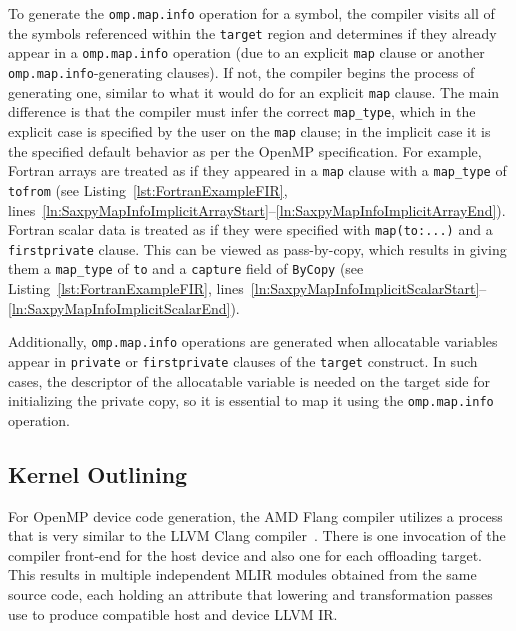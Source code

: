 \documentclass[acmtog,natbib=false]{acmart}
\newcommand{\code}[1]{\texttt{#1}\xspace}
\begin{document}
To generate the \code{omp.map.info} operation for a symbol, the compiler visits all of the symbols referenced within the \code{target} region and determines if they already appear in a \code{omp.map.info} operation (due to an explicit \code{map} clause or another \code{omp.map.info}-generating clauses). 
If not, the compiler begins the process of generating one, similar to what it would do for an explicit \code{map} clause.
The main difference is that the compiler must infer the correct \code{map\_type}, which in the explicit case is specified by the user on the \code{map} clause; in the implicit case it is the specified default behavior as per the OpenMP specification.
For example, Fortran arrays are treated as if they appeared in a \code{map} clause with a \code{map\_type} of \code{tofrom} (see Listing~\ref{lst:FortranExampleFIR}, lines~\ref{ln:SaxpyMapInfoImplicitArrayStart}--\ref{ln:SaxpyMapInfoImplicitArrayEnd}).
Fortran scalar data is treated as if they were specified with \code{map(to:...)} and a \code{firstprivate} clause.
This can be viewed as pass-by-copy, which results in giving them a \code{map\_type} of \code{to} and a \code{capture} field of \code{ByCopy} (see Listing~\ref{lst:FortranExampleFIR}, lines~\ref{ln:SaxpyMapInfoImplicitScalarStart}--\ref{ln:SaxpyMapInfoImplicitScalarEnd}). 

Additionally, \code{omp.map.info} operations are generated when allocatable variables appear in \code{private} or \code{firstprivate} clauses of the \code{target} construct.
In such cases, the descriptor of the allocatable variable is needed on the target side for initializing the private copy, so it is essential to map it using the \code{omp.map.info} operation.


\subsection{Kernel Outlining}
\label{sec:KernelOutlining}

For OpenMP device code generation, the AMD Flang compiler utilizes a process that is very similar to the LLVM Clang compiler~\cite{antao2016offloading}.
There is one invocation of the compiler front-end for the host device and also one for each offloading target.
This results in multiple independent \ac{MLIR} modules obtained from the same source code, each holding an attribute that lowering and transformation passes use to produce compatible host and device LLVM \ac{IR}.
\end{document}
